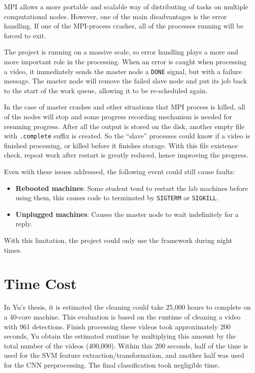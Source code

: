 \documentclass[bsc,frontabs,twoside,fullspacing,parskip,deptreport]{infthesis}
\begin{document}
MPI allows a more portable and scalable way of distributing of tasks on multiple computational nodes.
However, one of the main disadvantages is the error handling. 
If one of the MPI-process crashes, all of the processes running will be forced to exit.

The project is running on a massive scale, so error handling plays a more and more important role in the processing. 
When an error is caught when processing a video, it immediately sends the master node a {\tt DONE} signal, but with a failure message. The master node will remove the failed slave node and put its job back to the start of the work queue, allowing it to be re-scheduled again.

In the case of master crashes and other situations that MPI process is killed, all of the nodes will stop and some progress recording mechanism is needed for resuming progress. After all the output is stored on the disk, another empty file with {\tt .complete} suffix is created. So the ``slave'' processes could know if a video is finished processing, or killed before it finishes storage. With this file existence check, repeat work after restart is greatly reduced, hence improving the progress.

Even with these issues addressed, the following event could still cause faults:
\begin{itemize}
\setlength{\parskip}{0pt}
\item \textbf{Rebooted machines}: Some student tend to restart the lab machines before using them, this causes code to terminated by {\tt SIGTERM} or {\tt SIGKILL}.
\item \textbf{Unplugged machines}: Causes the master node to wait indefinitely for a reply.
\end{itemize}
With this limitation, the project could only use the framework during night times.

\section{Time Cost} 

In Yu's thesis\cite{Yu}, it is estimated the cleaning could take 25,000 hours to complete on a 40-core machine.
This evaluation is based on the runtime of cleaning a video with 961 detections.
Finish processing these videos took approximately 200 seconds, Yu obtain the estimated runtime by multiplying this amount by the total number of the videos (400,000).
Within this 200 seconds, half of the time is used for the SVM feature extraction/transformation, and another half was used for the CNN preprocessing. The final classification took negligible time.
\end{document}
